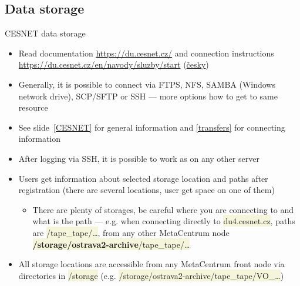 \documentclass[compress, ucs, xelatex, 11pt, xcolor=svgnames, aspectratio=169,
	hyperref={
		bookmarks=true,
		unicode=true,
		colorlinks=true,
		pdftitle={Linux, command line and MetaCentrum},
		plainpages=false,
		pdfauthor={Vojtech Zeisek},
		pdfsubject={Course about use of Linux command line, writing shell scripts and using MetaCentrum of CESNET},
		pdfcreator={XeLaTeX},
		pdfkeywords={Linux, GNU, BASH, shell, command line, MetaCentrum},
		linkcolor=DarkRed, %
		anchorcolor=DarkBlue, %
		citecolor=Indigo, %
		filecolor=NavyBlue, %
		menucolor=DarkMagenta, %
		urlcolor=DarkBlue, %
		pdftex},
	url={hyphens, lowtilde} %
	]{beamer}
\renewcommand{\texttt}[1]{\colorbox{Beige}{{\ttfamily #1}}}
\begin{document}
\subsection{Data storage}

\begin{frame}{CESNET data storage}
	\begin{itemize}
		\item Read documentation \url{https://du.cesnet.cz/} and connection instructions \url{https://du.cesnet.cz/en/navody/sluzby/start} (\href{https://du.cesnet.cz/cs/navody/sluzby/start}{česky})
		\item Generally, it is possible to connect via FTPS, NFS, SAMBA (Windows network drive), SCP/SFTP or SSH --- more options how to get to same resource
		\item See slide~\ref{CESNET} for general information and \ref{transfers} for connecting information
		\item After logging via SSH, it is possible to work as on any other server
		\item Users get information about selected storage location and paths after registration (there are several locations, user get space on one of them)
		\begin{itemize}
			\item There are plenty of storages, be careful where you are connecting to and what is the path --- e.g. when connecting directly to \texttt{du4.cesnet.cz}, paths are \texttt{/tape\_tape/\ldots}, from any other MetaCentrum node \texttt{\textbf{/storage/ostrava2-archive}/tape\_tape/\ldots}
		\end{itemize}
		\item All storage locations are accessible from any MetaCentrum front node via directories in \texttt{/storage} (e.g. \texttt{/storage/ostrava2-archive/tape\_tape/VO\_\ldots})
	\end{itemize}
\end{frame}
\end{document}
